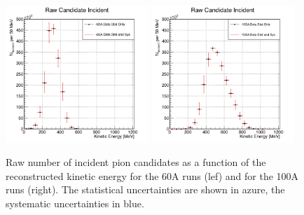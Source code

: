 \begin{figure}
\centering  
\includegraphics[width=0.48\textwidth]{Chapter-6/Images/Plots60A_StatSysc.png}
\includegraphics[width=0.48\textwidth]{Chapter-6/Images/Plots100A_StatSysc.png}
\caption{Raw number of incident pion candidates as a function of the reconstructed kinetic energy for the 60A runs (lef) and for the 100A runs (right). The statistical uncertainties are shown in azure, the systematic uncertainties in blue.}
\label{fig:IncidentRaw}
\end{figure}

